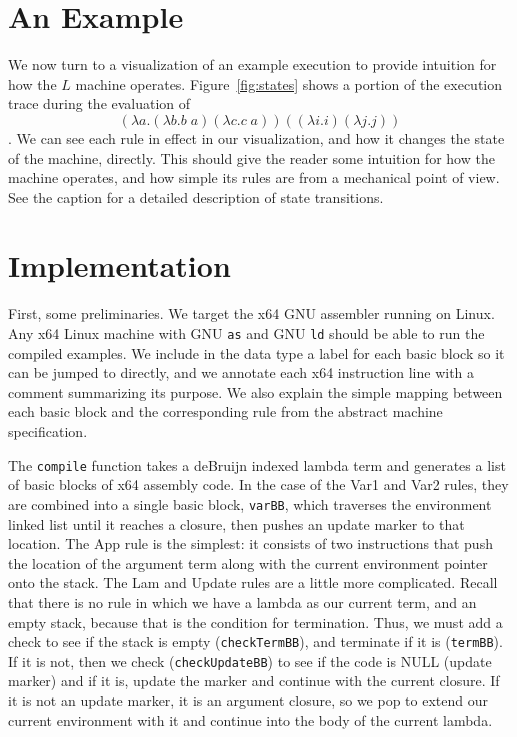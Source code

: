 \documentclass[preprint]{sigplanconf}
\begin{document}
\section{An Example}

We now turn to a visualization of an example execution to provide intuition for
how the $L$ machine operates. Figure~\ref{fig:states} shows a portion of the
execution trace during the evaluation of $$(\lambda a.(\lambda b.b \; a)
(\lambda c.c \; a)) ((\lambda i.i) (\lambda j.j))$$.   We
can see each rule in effect in our visualization, and how it changes the state
of the machine, directly. This should give the reader some intuition for how the
machine operates, and how simple its rules are from a mechanical point of view.
See the caption for a detailed description of state transitions. 

\section{Implementation}\label{sec:impl}

First, some preliminaries. We target the x64 GNU assembler running on
Linux. Any x64 Linux machine with GNU \texttt{as} and GNU \texttt{ld} should
be able to run the compiled examples.  We include in the data type a label for
each basic block so it can be jumped to directly, and we annotate each x64
instruction line with a comment summarizing its purpose.  We also explain the
simple mapping between each basic block and the corresponding rule from the
abstract machine specification.

The \texttt{compile} function takes a deBruijn indexed lambda term and
generates a list of basic blocks of x64 assembly code. In the case of the Var1
and Var2 rules, they are combined into a single basic block, \texttt{varBB},
which traverses the environment linked list until it reaches a closure, then
pushes an update marker to that location. The App rule is the simplest: it
consists of two instructions that push the location of the argument term along
with the current environment pointer onto the stack. The Lam and Update rules
are a little more complicated.  Recall that there is no rule in which we have a
lambda as our current term, and an empty stack, because that is the condition
for termination. Thus, we must add a check to see if the stack is empty
(\texttt{checkTermBB}), and terminate if it is (\texttt{termBB}). If it is not,
then we check (\texttt{checkUpdateBB}) to see if the code is NULL (update
marker) and if it is, update the marker and continue with the current closure.
If it is not an update marker, it is an argument closure, so we pop to extend
our current environment with it and continue into the body of the current
lambda.
\end{document}
